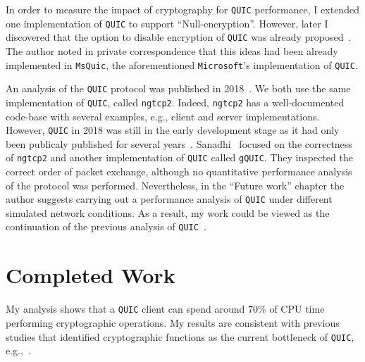\documentclass[12pt,a4paper,twoside,openright]{report}
\begin{document}
In order to measure the impact of cryptography for \texttt{QUIC} performance, I extended one implementation of \texttt{QUIC} to support \enquote{Null-encryption}.
However, later I discovered that the option to disable encryption of \texttt{QUIC} was already proposed~\cite{banks-quic-disable-encryption-00}.
The author noted in private correspondence that this ideas had been already implemented in \texttt{MsQuic}, the aforementioned \texttt{Microsoft}'s implementation of \texttt{QUIC}.



An analysis of the \texttt{QUIC} protocol was published in 2018~\cite{overview_of_the_QUIC_protocol}.
We both use the same implementation of \texttt{QUIC}, called \texttt{ngtcp2}.
Indeed, \texttt{ngtcp2} has a well-documented code-base with several examples, e.g., client and server implementations.   
However, \texttt{QUIC} in 2018 was still in the early development stage as it had only been publicaly published for several years~\cite{Chromium_Blog_Experimenting_with_quic}.
Sanadhi~\cite{overview_of_the_QUIC_protocol} focused on the correctness of \texttt{ngtcp2} and another implementation of \texttt{QUIC} called \texttt{gQUIC}.
They inspected the correct order of packet exchange, although no quantitative performance analysis of the protocol was performed.
Nevertheless, in the \enquote{Future work} chapter the author suggests carrying out a performance analysis of \texttt{QUIC} under different simulated network conditions.
As a result, my work could be viewed as the continuation of the previous analysis of \texttt{QUIC}~\cite{overview_of_the_QUIC_protocol}.







\section{Completed Work}
My analysis shows that a \texttt{QUIC} client can spend around 70\% of CPU time performing cryptographic operations. 
My results are consistent with previous studies that identified cryptographic functions as the current bottleneck of \texttt{QUIC}, e.g.,~\cite{Making_QUIC_Quicker}.






\end{document}
